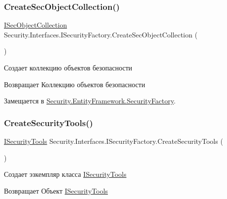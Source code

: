 \subsubsection{\texorpdfstring{Create\+Sec\+Object\+Collection()}{CreateSecObjectCollection()}}
{\footnotesize\ttfamily \hyperlink{interface_security_1_1_interfaces_1_1_collections_1_1_i_sec_object_collection}{I\+Sec\+Object\+Collection} Security.\+Interfaces.\+I\+Security\+Factory.\+Create\+Sec\+Object\+Collection (\begin{DoxyParamCaption}{ }\end{DoxyParamCaption})}



Создает коллекцию объектов безопасности 

\begin{DoxyReturn}{Возвращает}
Коллекцию объектов безопасности
\end{DoxyReturn}


Замещается в \hyperlink{class_security_1_1_entity_framework_1_1_security_factory_a6b5b70d573343faaf80fe95ff0e52ced}{Security.\+Entity\+Framework.\+Security\+Factory}.

\mbox{\label{interface_security_1_1_interfaces_1_1_i_security_factory_acf1eb07cd7264db66304340e9196b2af}} 
\subsubsection{\texorpdfstring{Create\+Security\+Tools()}{CreateSecurityTools()}}
{\footnotesize\ttfamily \hyperlink{interface_security_1_1_interfaces_1_1_i_security_tools}{I\+Security\+Tools} Security.\+Interfaces.\+I\+Security\+Factory.\+Create\+Security\+Tools (\begin{DoxyParamCaption}{ }\end{DoxyParamCaption})}



Создает эзкемпляр класса \hyperlink{interface_security_1_1_interfaces_1_1_i_security_tools}{I\+Security\+Tools} 

\begin{DoxyReturn}{Возвращает}
Объект \hyperlink{interface_security_1_1_interfaces_1_1_i_security_tools}{I\+Security\+Tools}
\end{DoxyReturn}


